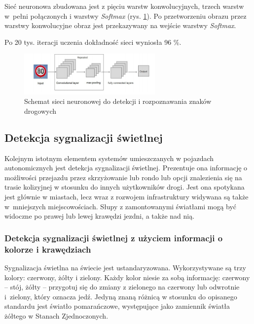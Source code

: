 Sieć neuronowa zbudowana jest z pięciu warstw konwolucyjnych, trzech warstw w~pełni połączonych i warstwy \textit{Softmax} (rys. \ref{fig:sign_detection3_cnn_schema}). 
Po przetworzeniu obrazu przez warstwy konwolucyjne obraz jest przekazywany na wejście warstwy \textit{Softmax}.

Po 20 tys. iteracji uczenia dokładność sieci wyniosła 96 \%.

\begin{figure}
  \centering
  \includegraphics[width=7cm]{img/sign_detection3_cnn_schema.png}
  \caption{Schemat sieci neuronowej do detekcji i rozpoznawania znaków drogowych\cite{T8}}
  \label{fig:sign_detection3_cnn_schema}
\end{figure}

\subsection{Detekcja sygnalizacji świetlnej}
\label{sec:tl}

Kolejnym istotnym elementem systemów umieszczanych w pojazdach autonomicznych jest detekcja sygnalizacji świetlnej.
Prezentuje ona informację o możliwości przejazdu przez skrzyżowanie lub rondo lub opcji znalezienia się na trasie kolizyjnej w stosunku do innych użytkowników drogi. 
Jest ona spotykana jest głównie w miastach, lecz wraz z rozwojem infrastruktury widywana są także w~mniejszych miejscowościach. 
Słupy z zamontowanymi światłami mogą być widoczne po prawej lub lewej krawędzi jezdni, a także nad nią.

\subsubsection{Detekcja sygnalizacji świetlnej z użyciem informacji o kolorze i krawędziach}

Sygnalizacja świetlna na świecie jest ustandaryzowana.
Wykorzystywane są trzy kolory: czerwony, żółty i zielony. 
Każdy kolor niesie za sobą informację: czerwony -- stój, żółty -- przygotuj się do zmiany z zielonego na czerwony lub odwrotnie i~zielony, który oznacza jedź. 
Jedyną znaną różnicą w stosunku do opisanego standardu jest światło pomarańczowe, występujące jako zamiennik światła żółtego w Stanach Zjednoczonych.

